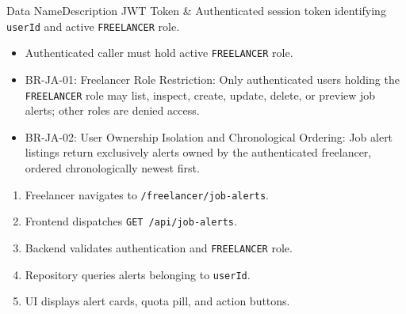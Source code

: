 
\begin{specdatatable}{Data Name}{Description}
JWT Token & Authenticated session token identifying \texttt{userId} and active \texttt{FREELANCER} role.\\ \hline
\end{specdatatable}

\begin{itemize}[leftmargin=1.6em,topsep=3pt,itemsep=2pt,parsep=0pt,label=$\bullet$]
    \item Authenticated caller must hold active \texttt{FREELANCER} role.
\end{itemize}

\begin{itemize}[leftmargin=1.6em,topsep=3pt,itemsep=2pt,parsep=0pt,label=$\bullet$]\brrulelist
    \item BR-JA-01: Freelancer Role Restriction: Only authenticated users holding the \texttt{FREELANCER} role may list, inspect, create, update, delete, or preview job alerts; other roles are denied access.
    \item BR-JA-02: User Ownership Isolation and Chronological Ordering: Job alert listings return exclusively alerts owned by the authenticated freelancer, ordered chronologically newest first.
\end{itemize}

\begin{enumerate}[leftmargin=1.8em,topsep=3pt,itemsep=2pt,parsep=0pt]
    \item Freelancer navigates to \texttt{/freelancer/job-alerts}.
    \item Frontend dispatches \texttt{GET /api/job-alerts}.
    \item Backend validates authentication and \texttt{FREELANCER} role.
    \item Repository queries alerts belonging to \texttt{userId}.
    \item UI displays alert cards, quota pill, and action buttons.
\end{enumerate}

